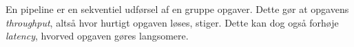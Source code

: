 En pipeline er en sekventiel udførsel af en gruppe opgaver.
Dette gør at opgavens \textit{throughput}, altså hvor hurtigt opgaven løses, stiger.
Dette kan dog også forhøje \textit{latency}, hvorved opgaven gøres langsomere.


